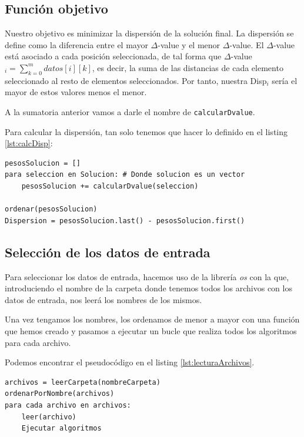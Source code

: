 \subsection{Función objetivo}

Nuestro objetivo es minimizar la dispersión de la solución final.
La dispersión se define como la diferencia entre el mayor $\Delta$-value y el menor $\Delta$-value.
El $\Delta$-value está asociado a cada posición seleccionada, de tal forma que $\Delta$-value$_{i} = \sum_{k=0}^{m}datos[i][k]$, es decir, la suma de las distancias de cada elemento seleccionado al resto de elementos seleccionados. Por tanto, nuestra Disp$_i$ sería el mayor de estos valores menos el menor.

A la sumatoria anterior vamos a darle el nombre de \texttt{calcularDvalue}.

Para calcular la dispersión, tan solo tenemos que hacer lo definido en el listing \ref{lst:calcDisp}:

\begin{lstlisting}[frame=single, caption={Cálculo de la dispersión para una posible solución}, captionpos=b, label=lst:calcDisp]
pesosSolucion = []
para seleccion en Solucion: # Donde solucion es un vector
    pesosSolucion += calcularDvalue(seleccion)

ordenar(pesosSolucion)
Dispersion = pesosSolucion.last() - pesosSolucion.first()
\end{lstlisting}



\subsection{Selección de los datos de entrada}

Para seleccionar los datos de entrada, hacemos uso de la librería \textit{os} con la que, introduciendo el nombre de la carpeta donde tenemos todos los archivos con los datos de entrada, nos leerá los nombres de los mismos.

Una vez tengamos los nombres, los ordenamos de menor a mayor con una función que hemos creado y pasamos a ejecutar un bucle que realiza todos los algoritmos para cada archivo.

Podemos encontrar el pseudocódigo en el listing \ref{lst:lecturaArchivos}.

\begin{lstlisting}[frame=single, caption={Versión búsqueda local}, captionpos=b, label=lst:lecturaArchivos]
archivos = leerCarpeta(nombreCarpeta)
ordenarPorNombre(archivos)
para cada archivo en archivos:
    leer(archivo)
    Ejecutar algoritmos
\end{lstlisting}


